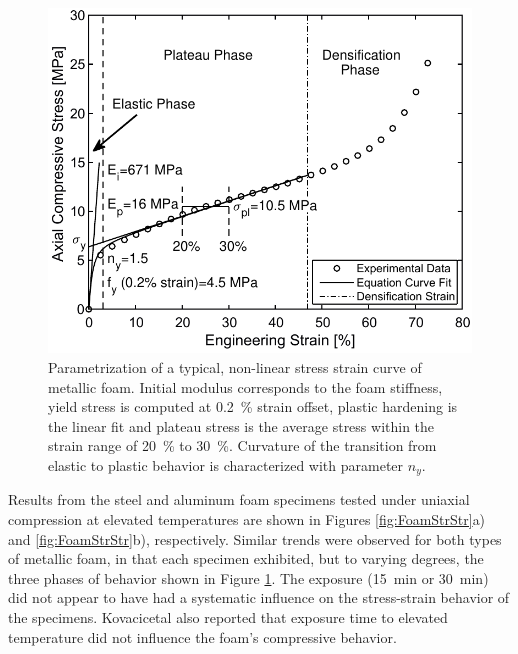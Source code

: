 \documentclass[review]{elsarticle}
\begin{document}
\begin{figure}[htbp]
	\begin{center}
		\includegraphics[width=0.75\linewidth]{Tex-Figures/Fig07.pdf}
		\caption{Parametrization of a typical, non-linear stress strain curve of metallic foam. Initial modulus corresponds to the foam stiffness, yield stress is computed at 0.2~\% strain offset, plastic hardening is the linear fit and plateau stress is the average stress within the strain range of 20~\% to 30~\%. Curvature of the transition from elastic to plastic behavior is characterized with parameter $n_y$.}
		\label{fig:MetFoaBeh}
	\end{center}
\end{figure}

Results from the steel and aluminum foam specimens tested under uniaxial compression at elevated temperatures are shown in Figures \ref{fig:FoamStrStr}a) and \ref{fig:FoamStrStr}b), respectively. Similar trends were observed for both types of metallic foam, in that each specimen exhibited, but to varying degrees, the three phases of behavior shown in Figure \ref{fig:MetFoaBeh}. The exposure (15~min or 30~min) did not appear to have had a systematic influence on the stress-strain behavior of the specimens. Kovacicetal \cite{Kovacicetal2016} also reported that exposure time to elevated temperature did not influence the foam's compressive behavior.
\end{document}

